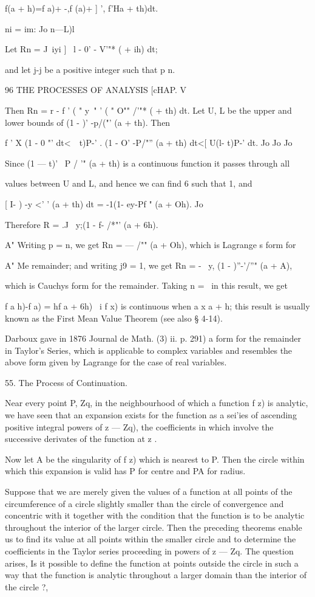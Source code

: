 {{f(a + h)=f a)+ -,f (a)+ ] ', f'Ha + th)dt.

ni = im: Jo n—L)l

Let Rn = J~iyi ] \ l - 0' - V'"* ( + ih) dt;

and let j-j be a positive integer such that p n.

96 THE PROCESSES OF ANALYSIS [cHAP. V

Then Rn = r - f ' ( " y~" ' ( " O"" /'"* ( + th) dt. Let U, L be the
upper and lower bounds of (1 - )' -p/("' (a + th). Then

f ' X (1 - 0 "' dt<\ \ t)P-' . (1 - O' -P/"'' (a + th) dt<[ U(l- t)P-'
dt. Jo Jo Jo

Since (1 — t)' ~P / '" (a + th) is a continuous function it passes
through all

values between U and L, and hence we can find 6 such that 1, and

[ I- ) -y <' ' (a + th) dt = -1(1- ey-Pf " (a + Oh). Jo

Therefore R = .J \ y;(1 - f- /*"' (a + 6h).

A" Writing p = n, we get Rn = — /"" (a + Oh), which is Lagrange s form
for

A" Me remainder; and writing j9 = 1, we get Rn = - \, y, (1 -
)''-'/''" (a + A),

which is Cauchys form for the remainder. Taking n = \ in this result,
we get

f a h)-f a) = hf a + 6h) \ i f x) is continuous when a x a + h; this
result is usually known as the First Mean Value Theorem (see also §
4-14).

Darboux gave in 1876 Journal de Math. (3) ii. p. 291) a form for the
remainder in Taylor's Series, which is applicable to complex variables
and resembles the above form given by Lagrange for the case of real
variables.

55. The Process of Continuation.

Near every point P, Zq, in the neighbourhood of which a function f z)
is analytic, we have seen that an expansion exists for the function as
a sei'ies of ascending positive integral powers of z — Zq), the
coefficients in which involve the successive derivates of the function
at z .

Now let A be the singularity of f z) which is nearest to P. Then the
circle within which this expansion is valid has P for centre and PA
for radius.

Suppose that we are merely given the values of a function at all
points of the circumference of a circle slightly smaller than the
circle of convergence and concentric with it together with the
condition that the function is to be analytic throughout the interior
of the larger circle. Then the preceding theorems enable us to find
its value at all points within the smaller circle and to determine the
coefficients in the Taylor series proceeding in powers of z — Zq. The
question arises, Is it possible to define the function at points
outside the circle in such a way that the function is analytic
throughout a larger domain than the interior of the circle ?,

}}
